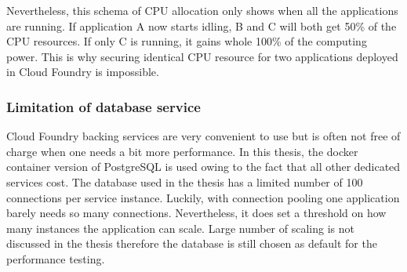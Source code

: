 Nevertheless, this schema of CPU allocation only shows when all the applications are running. If application A now starts idling, B and C will both get 50\% of the CPU resources. If only C is running, it gains whole 100\% of the computing power. This is why securing identical CPU resource for two applications deployed in Cloud Foundry is impossible.\\
\subsubsection{Limitation of database service}
Cloud Foundry backing services are very convenient to use but is often not free of charge when one needs a bit more performance. In this thesis, the docker container version of PostgreSQL is used owing to the fact that all other dedicated services cost. The database used in the thesis has a limited number of 100 connections per service instance. Luckily,  with connection pooling one application barely needs so many connections. Nevertheless, it does set a threshold on how many instances the application can scale. Large number of scaling is not discussed in the thesis therefore the database is still chosen as default for the performance testing. \\

